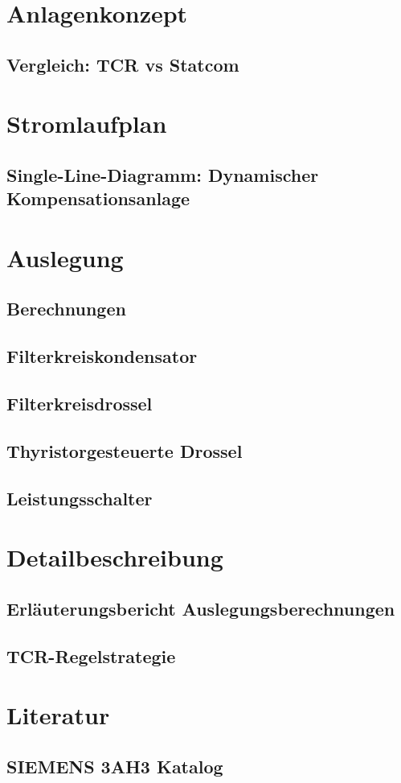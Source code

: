 \section{Anlagenkonzept}
\subsection{Vergleich: TCR vs Statcom }
\section{Stromlaufplan}
\subsection{ Single-Line-Diagramm: Dynamischer Kompensationsanlage}
\section{Auslegung}
\subsection{Berechnungen}
\subsection{Filterkreiskondensator}  
\subsection{Filterkreisdrossel}
\subsection{Thyristorgesteuerte Drossel}
\subsection{Leistungsschalter}
\section{Detailbeschreibung}
\subsection{Erläuterungsbericht Auslegungsberechnungen}
\subsection{TCR-Regelstrategie}

\section{Literatur}
\subsection{SIEMENS 3AH3 Katalog}